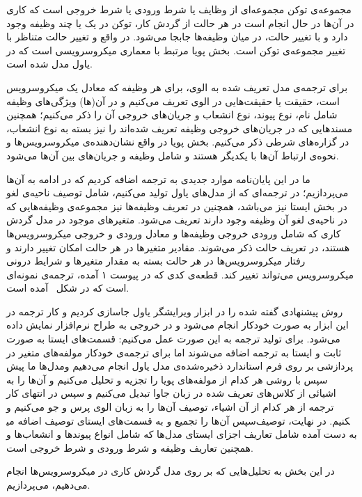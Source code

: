 مجموعه‌ی توکن مجموعه‌ای از وظایف یا شرط ورودی یا شرط خروجی است که کاری در آن‌ها در حال انجام است در هر حالت از گردش کار، توکن در یک یا چند وظیفه وجود دارد و با تغییر حالت، در میان وظیفه‌ها جابجا می‌شود. در واقع و تغییر حالت متناظر با تغییر مجموعه‌ی توکن است. 
بخش پویا مرتبط با معماری میکروسرویسی است که در یاول مدل شده است. 

برای ترجمه‌ی مدل تعریف شده به الوی، برای هر وظیفه که معادل یک میکروسرویس است، حقیقت یا حقیقت‌هایی در الوی تعریف می‌کنیم و در آن(ها) ویژگی‌های وظیفه شامل نام، نوع پیوند، نوع انشعاب و جریان‌های خروجی آن را ذکر می‌کنیم؛ 
همچنین مسندهایی که در جریان‌های خروجی وظیفه تعریف شده‌اند را نیز بسته به نوع انشعاب، در گزاره‌های شرطی ذکر می‌کنیم. 
بخش‌ پویا در واقع نشان‌دهنده‌ی میکروسرویس‌ها و نحوه‌ی ارتباط آن‌ها با یکدیگر هستند و شامل وظیفه و جریان‌های بین آن‌ها می‌شود.
 
ما در این پایان‌نامه موارد جدیدی به ترجمه اضافه کردیم که در ادامه به آن‌ها می‌پردازیم؛ در ترجمه‌ای که از مدل‌های یاول تولید می‌کنیم، شامل توصیف ناحیه‌ی لغو در بخش ایستا نیز می‌باشد، 
همچنین در تعریف وظیفه‌ها نیز مجموعه‌ی وظیفه‌هایی که در ناحیه‌ی لغو آن وظیفه وجود دارند تعریف می‌شود. 
متغیرهای موجود در مدل گردش کاری که شامل ورودی خروجی وظیفه‌ها و معادل ورودی و خروجی میکروسرویس‌ها هستند، در تعریف حالت ذکر می‌شوند. 
مقادیر متغیرها در هر حالت امکان تغییر دارند و رفتار میکروسرویس‌ها در هر حالت بسته به مقدار متغیرها و شرایط درونی میکروسرویس می‌تواند تغییر کند.
قطعه‌ی کدی که در پیوست ۱ آمده، ترجمه‌ی نمونه‌‌ای است که در شکل~ آمده است.


روش پیشنهادی گفته شده را در ابزار ویرایشگر یاول جاسازی کردیم و کار ترجمه در این ابزار به صورت خودکار انجام می‌شود و در خروجی به طراح نرم‌افزار نمایش داده می‌شود. برای تولید ترجمه به این صورت عمل می‌کنیم: قسمت‌های ایستا به صورت ثابت و ایستا به ترجمه اضافه می‌شوند اما برای ترجمه‌ی خودکار مولفه‌های متغیر در مدل‌ها ما پیش‌‎پردازشی بر روی فرم استاندارد ذخیره‌شده‌ی مدل‌ یاول انجام می‌دهیم و سپس با روشی هر کدام از مولفه‌های پویا را تجزیه و تحلیل می‌کنیم و آن‌ها را به اشیائی از کلاس‌های تعریف شده در زبان جاوا تبدیل می‌کنیم و سپس در انتهای کار ترجمه از هر کدام از آن اشیاء، توصیف آن‌ها را به زبان الوی پرس و جو می‌کنیم و سپس آن‌ها را تجمیع و به قسمت‌های ایستای توصیف اضافه می‎کنیم. در نهایت، توصیف به دست آمده شامل تعاریف اجزای ایستای مدل‌ها که شامل انواع پیوندها و انشعاب‌ها و همچنین تعاریف وظیفه و شرط ورودی و شرط خروجی است.

در این بخش به تحلیل‌هایی که بر روی مدل گردش کاری در میکروسرویس‌ها انجام می‌دهیم، می‌پردازیم. 

